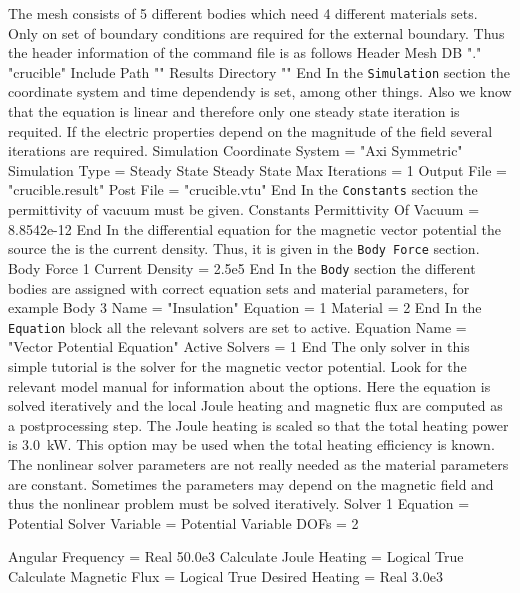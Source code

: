 The mesh consists of 5 different bodies which need 4
different materials sets. Only on set of boundary conditions 
are required for the external boundary. Thus the header 
information of the command file is as follows
\ttbegin
Header
  Mesh DB "." "crucible"
  Include Path ""
  Results Directory ""
End
\ttend
%
In the \texttt{Simulation} section the coordinate system and
time dependendy is set, among other things. Also we know that
the equation is linear and therefore only one steady state
iteration is requited. If the electric properties depend on 
the magnitude of the field several iterations are required.
\ttbegin
Simulation
  Coordinate System = "Axi Symmetric"
  Simulation Type = Steady State
  Steady State Max Iterations = 1
  Output File = "crucible.result"
  Post File = "crucible.vtu"
End
\ttend
%
In the \texttt{Constants} section the permittivity of 
vacuum must be given.
\ttbegin
Constants
  Permittivity Of Vacuum = 8.8542e-12
End
\ttend
%
In the differential equation for the magnetic vector potential the 
source the is the current density. Thus, it is given in the
\texttt{Body Force} section. 
\ttbegin
Body Force 1
  Current Density = 2.5e5
End
\ttend
%
In the \texttt{Body} section the different bodies are assigned 
with correct equation sets and material parameters, for example
\ttbegin
Body 3
  Name = "Insulation"
  Equation = 1
  Material = 2
End
\ttend
%
In the \texttt{Equation} block all the relevant solvers are 
set to active.
\ttbegin
Equation
  Name = "Vector Potential Equation"
  Active Solvers = 1
End
\ttend
%
The only solver in this simple tutorial is the solver for the magnetic
vector potential. Look for the relevant model manual for information
about the options. Here the equation is solved iteratively and the
local Joule heating and magnetic flux are computed as a postprocessing
step. The Joule heating is scaled so that the total heating power is
3.0~kW. This option may be used when the total heating efficiency is
known.  The nonlinear solver parameters are not really needed as the
material parameters are constant. Sometimes the parameters may depend
on the magnetic field and thus the nonlinear problem must be solved
iteratively.
%
\ttbegin
Solver 1
  Equation = Potential Solver
  Variable = Potential
  Variable DOFs = 2

  Angular Frequency = Real 50.0e3
  Calculate Joule Heating = Logical True
  Calculate Magnetic Flux = Logical True
  Desired Heating = Real 3.0e3

